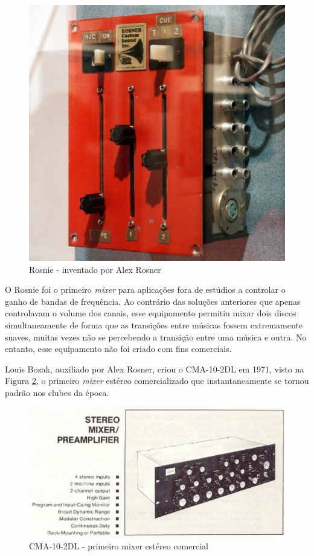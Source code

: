 \begin{figure}[h]
	\centering
    \includegraphics[scale=0.4]{figuras/fig08.eps}
	\caption{Rosnie - inventado por Alex Rosner \cite{stoneyroadsStoryBehind}}
	\label{fig08}
\end{figure}

O Rosnie foi o primeiro \textit{mixer} para aplicações fora de estúdios a controlar o ganho de bandas de frequência. Ao contrário das soluções anteriores que apenas controlavam o volume dos canais, esse equipamento permitiu mixar dois discos simultaneamente de forma que as transições entre músicas fossem extremamente suaves, muitas vezes não se percebendo a transição entre uma música e outra. No entanto, esse equipamento não foi criado com fins comerciais.

Louis Bozak, auxiliado por Alex Rosner, criou o CMA-10-2DL em 1971, visto na Figura \ref{fig10}, o primeiro \textit{mixer} estéreo comercializado que instantaneamente se tornou padrão nos clubes da época.

\begin{figure}[h]
	\centering
    \includegraphics[scale=0.6]{figuras/fig10.eps}
	\caption{CMA-10-2DL - primeiro mixer estéreo comercial \cite{electronicaptBozak102}}
	\label{fig10}
\end{figure}

